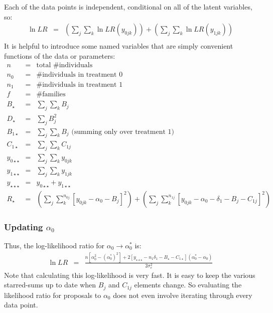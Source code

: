 \documentclass[11pt]{article}
\begin{document}
Each of the data points is independent, conditional on all of the latent variables, so:
\begin{eqnarray*}
\ln LR & = & \left(\sum_j\sum_k \ln LR(y_{0jk})  \right) + \left(\sum_j\sum_k \ln LR(y_{1jk})  \right)\\
\end{eqnarray*}
It is helpful to introduce some named variables that are simply convenient functions of the data or parameters:
\begin{eqnarray*}
n & = & \mbox{total \# individuals} \\
n_0 & = & \mbox{\# individuals in treatment 0} \\
n_1 & = & \mbox{\# individuals in treatment 1} \\
f & = & \mbox{\# families} \\
B_{\star} & = & \sum_j \sum_k B_j \\
D_{\star} & = & \sum_j B_j^2 \\
B_{1\star} & = & \sum_j \sum_k B_j \mbox{ (summing only over treatment 1)}\\
C_{1\star} & = & \sum_j \sum_k C_{1j} \\
y_{0\star\star} & = & \sum_j\sum_k y_{0jk} \\
y_{1\star\star} & = & \sum_j\sum_k y_{1jk} \\
y_{\star\star\star} & = & y_{0\star\star} + y_{1\star\star} \\
R_{\star} & = & \left(\sum_j\sum_k^{n_{0j}}\left[y_{0jk} - \alpha_0 - B_j\right]^2 \right) + \left(\sum_j\sum_k^{n_{1j}}\left[y_{0jk} - \alpha_0 - \delta_1 - B_j - C_{1j}\right]^2 \right)\end{eqnarray*}

\subsubsection*{Updating $\alpha_0$}
Thus, the log-likelihood ratio for  $\alpha_0\rightarrow\alpha_0^{\ast}$ is: 
\begin{eqnarray*}
\ln LR & = & \frac{n\left[\alpha_0^2 - (\alpha_0^{\ast})^2\right]  + 2\left[y_{\star\star\star} - n_1\delta_1  - B_{\star}  - C_{1\star}\right](\alpha_0^\ast - \alpha_0)}{2\sigma_e^2} 
\end{eqnarray*}
Note that calculating this log-likelihood is very fast.
It is easy to keep the various starred-sums up to date when $B_j$ and $C_{1j}$ elements change.
So evaluating the likelihood ratio for proposals to $\alpha_0$ does not even involve iterating through every data point.
\end{document}
